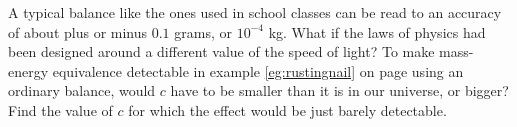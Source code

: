 A typical balance like the ones used in school classes can be read to an accuracy
of about plus or minus $0.1$ grams, or $10^{-4}$ kg. What if the laws of physics had been
designed around a different value of the speed of light? To make mass-energy
equivalence detectable in example \ref{eg:rustingnail} on page \pageref{eg:rustingnail}
using an ordinary balance, would $c$ have to be smaller than it is in our universe,
or bigger? Find the value of $c$ for which the effect would be just barely detectable.\answercheck
